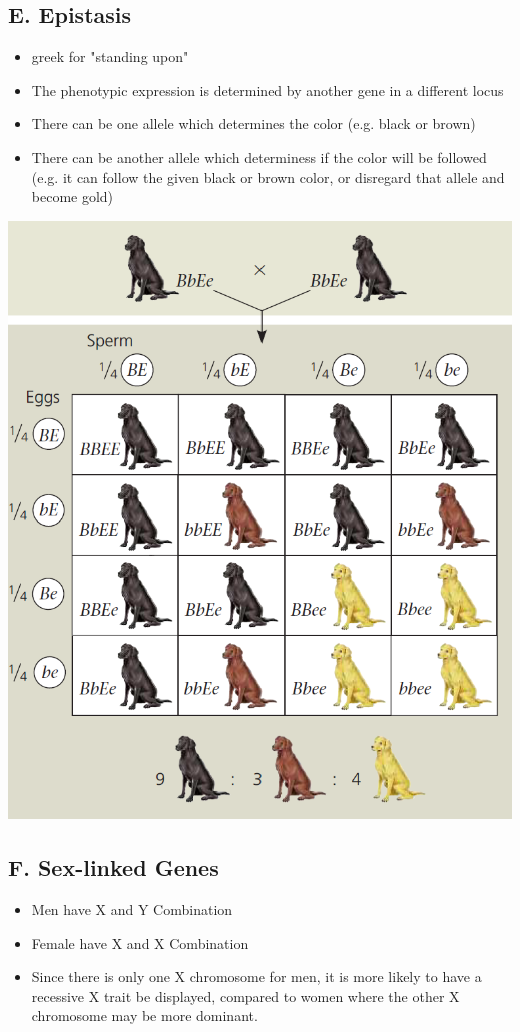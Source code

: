 \documentclass{article}
\begin{document}
\subsection*{E. Epistasis}
\begin{itemize}
    \item greek for "standing upon"
    \item The phenotypic expression is determined by another gene in a different locus
    \item There can be one allele which determines the color (e.g. black or brown)
    \item There can be another allele which determiness if the color will be followed (e.g. it can follow the given black or brown color, or disregard that allele and become gold)
\end{itemize}
\includegraphics*[scale=0.7]{epistasis.png}

\subsection*{F. Sex-linked Genes}
\begin{itemize}
    \item Men have X and Y Combination
    \item Female have X and X Combination
    \item Since there is only one X chromosome for men, it is more likely to have a recessive X trait be displayed, compared to women where the other X chromosome may be more dominant.
\end{itemize}
\end{document}
